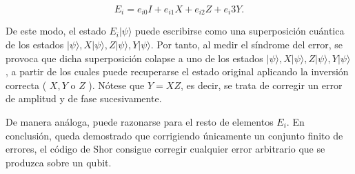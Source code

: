$$ E_i = e_{i0}I+ e_{i1}X + e_{i2}Z+ e_i3Y. $$

De este modo, el estado $ E_i | \psi \rangle$ puede escribirse como una superposición cuántica de los estados $| \psi \rangle, X | \psi \rangle, Z | \psi \rangle, Y | \psi \rangle.  $ Por tanto, al medir el síndrome del error, se provoca que dicha superposición colapse a uno de los estados $| \psi \rangle, X | \psi \rangle, Z | \psi \rangle, Y | \psi \rangle$, a partir de los cuales puede recuperarse el estado original aplicando la inversión correcta ( $X, Y$ o $Z$ ). Nótese que $Y=XZ$, es decir, se trata de corregir un error de amplitud y de fase sucesivamente. 

De manera análoga, puede razonarse para el resto de elementos $E_i$. En conclusión, queda demostrado que corrigiendo únicamente un conjunto finito de errores, el código de Shor consigue corregir cualquier error arbitrario que se produzca sobre un qubit. 